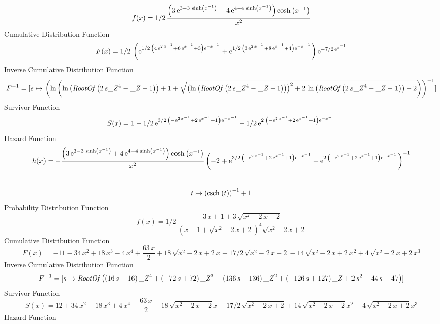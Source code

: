 \documentclass[12pt]{article}
\begin{document}
$$  f(x)=1/2\,{\frac { \left( 3\,{{\rm e}^{3-3\,\sinh \left( {x}^{-1} \right) }
}+4\,{{\rm e}^{4-4\,\sinh \left( {x}^{-1} \right) }} \right) \cosh
 \left( {x}^{-1} \right) }{{x}^{2}}}
$$Cumulative Distribution Function  
 $$F(x)=1/2\, \left( {{\rm e}^{1/2\, \left( 4\,{{\rm e}^{2\,{x}^{-1}}}+6\,{
{\rm e}^{{x}^{-1}}}+3 \right) {{\rm e}^{-{x}^{-1}}}}}+{{\rm e}^{1/2\,
 \left( 3\,{{\rm e}^{2\,{x}^{-1}}}+8\,{{\rm e}^{{x}^{-1}}}+4 \right) {
{\rm e}^{-{x}^{-1}}}}} \right) {{\rm e}^{-7/2\,{{\rm e}^{{x}^{-1}}}}}
$$ Inverse Cumulative Distribution Function 
  $$F^{-1} = [s\mapsto  \left( \ln  \left( \ln  \left( {\it RootOf} \left( 2\,s{{
\it \_Z}}^{4}-{\it \_Z}-1 \right)  \right) +1+\sqrt { \left( \ln 
 \left( {\it RootOf} \left( 2\,s{{\it \_Z}}^{4}-{\it \_Z}-1 \right) 
 \right)  \right) ^{2}+2\,\ln  \left( {\it RootOf} \left( 2\,s{{\it 
\_Z}}^{4}-{\it \_Z}-1 \right)  \right) +2} \right)  \right) ^{-1}]
$$Survivor Function 
 $$ S(x)=1-1/2\,{{\rm e}^{3/2\, \left( -{{\rm e}^{2\,{x}^{-1}}}+2\,{{\rm e}^{{x
}^{-1}}}+1 \right) {{\rm e}^{-{x}^{-1}}}}}-1/2\,{{\rm e}^{2\, \left( -
{{\rm e}^{2\,{x}^{-1}}}+2\,{{\rm e}^{{x}^{-1}}}+1 \right) {{\rm e}^{-{
x}^{-1}}}}}
$$ Hazard Function 
 $$ h(x)=-{\frac { \left( 3\,{{\rm e}^{3-3\,\sinh \left( {x}^{-1} \right) }}+4
\,{{\rm e}^{4-4\,\sinh \left( {x}^{-1} \right) }} \right) \cosh
 \left( {x}^{-1} \right) }{{x}^{2}} \left( -2+{{\rm e}^{3/2\, \left( -
{{\rm e}^{2\,{x}^{-1}}}+2\,{{\rm e}^{{x}^{-1}}}+1 \right) {{\rm e}^{-{
x}^{-1}}}}}+{{\rm e}^{2\, \left( -{{\rm e}^{2\,{x}^{-1}}}+2\,{{\rm e}^
{{x}^{-1}}}+1 \right) {{\rm e}^{-{x}^{-1}}}}} \right) ^{-1}}
$$-------------------------------------------------------------------------------------------  \\$$t\mapsto  \left( {\rm csch} \left(t\right) \right) ^{-1}+1
$$Probability Distribution Function 
$$  f(x)=1/2\,{\frac {3\,x+1+3\,\sqrt {{x}^{2}-2\,x+2}}{ \left( x-1+\sqrt {{x}^
{2}-2\,x+2} \right) ^{4}\sqrt {{x}^{2}-2\,x+2}}}
$$Cumulative Distribution Function  
 $$F(x)=-11-34\,{x}^{2}+18\,{x}^{3}-4\,{x}^{4}+{\frac {63\,x}{2}}+18\,\sqrt {{
x}^{2}-2\,x+2}x-17/2\,\sqrt {{x}^{2}-2\,x+2}-14\,\sqrt {{x}^{2}-2\,x+2
}{x}^{2}+4\,\sqrt {{x}^{2}-2\,x+2}{x}^{3}
$$ Inverse Cumulative Distribution Function 
  $$F^{-1} = [s\mapsto {\it RootOf} \left(  \left( 16\,s-16 \right) {{\it \_Z}}^{4}
+ \left( -72\,s+72 \right) {{\it \_Z}}^{3}+ \left( 136\,s-136 \right) 
{{\it \_Z}}^{2}+ \left( -126\,s+127 \right) {\it \_Z}+2\,{s}^{2}+44\,s
-47 \right) ]
$$Survivor Function 
 $$ S(x)=12+34\,{x}^{2}-18\,{x}^{3}+4\,{x}^{4}-{\frac {63\,x}{2}}-18\,\sqrt {{x
}^{2}-2\,x+2}x+17/2\,\sqrt {{x}^{2}-2\,x+2}+14\,\sqrt {{x}^{2}-2\,x+2}
{x}^{2}-4\,\sqrt {{x}^{2}-2\,x+2}{x}^{3}
$$ Hazard Function 
\end{document}
